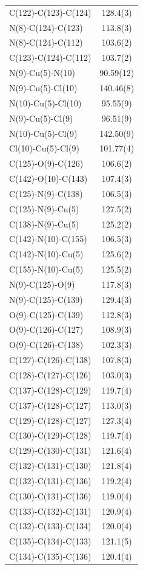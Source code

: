 \begin{center}
{\begin{supertabular}{p{1.5in}c}
C(122)-C(123)-C(124)&128.4(3)\\
N(8)-C(124)-C(123)&113.8(3)\\
N(8)-C(124)-C(112)&103.6(2)\\
C(123)-C(124)-C(112)&103.7(2)\\
N(9)-Cu(5)-N(10)&90.59(12)\\
N(9)-Cu(5)-Cl(10)&140.46(8)\\
N(10)-Cu(5)-Cl(10)&95.55(9)\\
N(9)-Cu(5)-Cl(9)&96.51(9)\\
N(10)-Cu(5)-Cl(9)&142.50(9)\\
Cl(10)-Cu(5)-Cl(9)&101.77(4)\\
C(125)-O(9)-C(126)&106.6(2)\\
C(142)-O(10)-C(143)&107.4(3)\\
C(125)-N(9)-C(138)&106.5(3)\\
C(125)-N(9)-Cu(5)&127.5(2)\\
C(138)-N(9)-Cu(5)&125.2(2)\\
C(142)-N(10)-C(155)&106.5(3)\\
C(142)-N(10)-Cu(5)&125.6(2)\\
C(155)-N(10)-Cu(5)&125.5(2)\\
N(9)-C(125)-O(9)&117.8(3)\\
N(9)-C(125)-C(139)&129.4(3)\\
O(9)-C(125)-C(139)&112.8(3)\\
O(9)-C(126)-C(127)&108.9(3)\\
O(9)-C(126)-C(138)&102.3(3)\\
C(127)-C(126)-C(138)&107.8(3)\\
C(128)-C(127)-C(126)&103.0(3)\\
C(137)-C(128)-C(129)&119.7(4)\\
C(137)-C(128)-C(127)&113.0(3)\\
C(129)-C(128)-C(127)&127.3(4)\\
C(130)-C(129)-C(128)&119.7(4)\\
C(129)-C(130)-C(131)&121.6(4)\\
C(132)-C(131)-C(130)&121.8(4)\\
C(132)-C(131)-C(136)&119.2(4)\\
C(130)-C(131)-C(136)&119.0(4)\\
C(133)-C(132)-C(131)&120.9(4)\\
C(132)-C(133)-C(134)&120.0(4)\\
C(135)-C(134)-C(133)&121.1(5)\\
C(134)-C(135)-C(136)&120.4(4)\\

\end{supertabular}}
\end{center}
